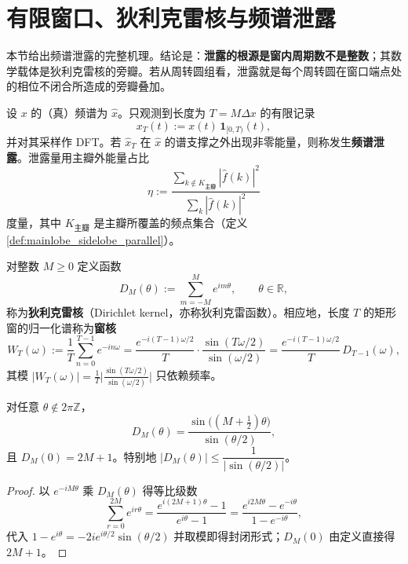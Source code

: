 \section{有限窗口、狄利克雷核与频谱泄露}\label{sec:window_dirichlet}

本节给出频谱泄露的完整机理。结论是：\textbf{泄露的根源是窗内周期数不是整数}；其数学载体是狄利克雷核的旁瓣。若从周转圆组看，泄露就是每个周转圆在窗口端点处的相位不闭合所造成的旁瓣叠加。

\begin{definition}[频谱泄露]\label{def:spectral_leakage}
设 $x$ 的（真）频谱为 $\hat x$。只观测到长度为 $T=M\Delta x$ 的有限记录
\[
x_T(t):=x(t)\,\mathbf{1}_{[0,T)}(t),
\]
并对其采样作 DFT。若 $\hat x_T$ 在 $\hat x$ 的谱支撑之外出现非零能量，则称发生\textbf{频谱泄露}。泄露量用主瓣外能量占比
\[
\eta:=\frac{\displaystyle\sum_{k\notin K_{\text{主瓣}}}|\hat f(k)|^2}{\displaystyle\sum_{k}|\hat f(k)|^2}
\]
度量，其中 $K_{\text{主瓣}}$ 是主瓣所覆盖的频点集合（定义 \ref{def:mainlobe_sidelobe_parallel}）。
\end{definition}

\begin{definition}[狄利克雷核]\label{def:dirichlet_kernel_parallel}
对整数 $M\ge0$ 定义函数
\[
D_M(\theta):=\sum_{m=-M}^{M}e^{im\theta},\qquad \theta\in\mathbb{R},
\]
称为\textbf{狄利克雷核}（Dirichlet kernel，亦称狄利克雷函数）。相应地，长度 $T$ 的矩形窗的归一化谱称为\textbf{窗核}
\[
W_T(\omega):=\frac{1}{T}\sum_{n=0}^{T-1}e^{-in\omega}
=\frac{e^{-i(T-1)\omega/2}}{T}\cdot\frac{\sin(T\omega/2)}{\sin(\omega/2)}
=\frac{e^{-i(T-1)\omega/2}}{T}\,D_{T-1}(\omega),
\]
其模 $|W_T(\omega)|=\frac{1}{T}\big|\frac{\sin(T\omega/2)}{\sin(\omega/2)}\big|$ 只依赖频率。
\end{definition}

\begin{lemma}[狄利克雷核的封闭形式]\label{lem:dirichlet_kernel_closed_form}
对任意 $\theta\notin2\pi\mathbb{Z}$，
\[
D_M(\theta)=\frac{\sin\big((M+\tfrac12)\theta\big)}{\sin(\theta/2)},
\]
且 $D_M(0)=2M+1$。特别地 $|D_M(\theta)|\le\dfrac{1}{|\sin(\theta/2)|}$。
\end{lemma}

\begin{proof}
以 $e^{-iM\theta}$ 乘 $D_M(\theta)$ 得等比级数
\[
\sum_{r=0}^{2M}e^{ir\theta}=\frac{e^{i(2M+1)\theta}-1}{e^{i\theta}-1}
=\frac{e^{i2M\theta}-e^{-i\theta}}{1-e^{-i\theta}} ,
\]
代入 $1-e^{i\theta}=-2ie^{i\theta/2}\sin(\theta/2)$ 并取模即得封闭形式；$D_M(0)$ 由定义直接得 $2M+1$。
\end{proof}

